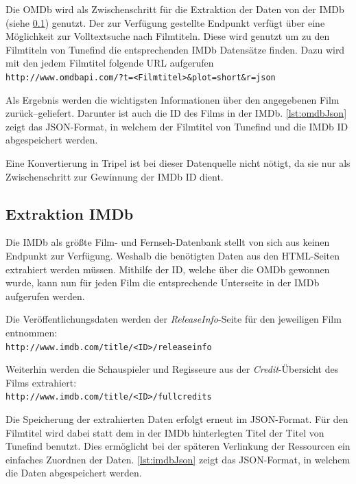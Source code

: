 \documentclass[parskip]{scrartcl}
\begin{document}
Die OMDb wird als Zwischenschritt für die Extraktion der Daten von der IMDb (siehe \ref{subsec:imdb}) genutzt. Der zur Verfügung gestellte Endpunkt verfügt über eine Möglichkeit zur Volltextsuche nach Filmtiteln. Diese wird genutzt um zu den Filmtiteln von Tunefind die entsprechenden IMDb Datensätze finden. Dazu wird mit den jedem Filmtitel folgende URL aufgerufen\\
\texttt{http://www.omdbapi.com/?t=<Filmtitel>\&plot=short\&r=json}

Als Ergebnis werden die wichtigsten Informationen über den angegebenen Film zurück--geliefert. Darunter ist auch die ID des Films in der IMDb. \autoref{lst:omdbJson} zeigt das JSON-Format, in welchem der Filmtitel von Tunefind und die IMDb ID abgespeichert werden.



Eine Konvertierung in Tripel ist bei dieser Datenquelle nicht nötigt, da sie nur als Zwischenschritt zur Gewinnung der IMDb ID dient.

\subsection{Extraktion IMDb}
\label{subsec:imdb}

Die IMDb als größte Film- und Fernseh-Datenbank stellt von sich aus keinen Endpunkt zur Verfügung. Weshalb die benötigten Daten aus den HTML-Seiten extrahiert werden müssen. Mithilfe der ID, welche über die OMDb gewonnen wurde, kann nun für jeden Film die entsprechende Unterseite in der IMDb aufgerufen werden.

Die Veröffentlichungsdaten werden der \textit{ReleaseInfo}-Seite für den jeweiligen Film entnommen:\\
\texttt{http://www.imdb.com/title/<ID>/releaseinfo}

Weiterhin werden die Schauspieler und Regisseure aus der \textit{Credit}-Übersicht des Films extrahiert:\\
\texttt{http://www.imdb.com/title/<ID>/fullcredits}

Die Speicherung der extrahierten Daten erfolgt erneut im JSON-Format. Für den Filmtitel wird dabei statt dem in der IMDb hinterlegten Titel der Titel von Tunefind benutzt. Dies ermöglicht bei der späteren Verlinkung der Ressourcen ein einfaches Zuordnen der Daten. \autoref{lst:imdbJson} zeigt das JSON-Format, in welchem die Daten abgespeichert werden.


\end{document}
